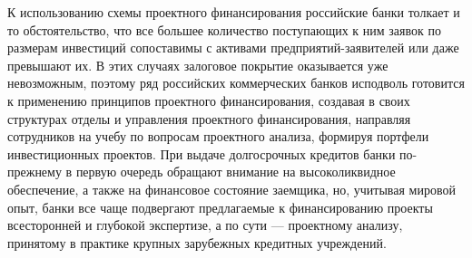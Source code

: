 К использованию схемы проектного финансирования российские банки толкает и то обстоятельство, что все большее количество поступающих к ним заявок по размерам инвестиций сопоставимы с активами предприятий-заявителей или даже превышают их.
В этих случаях залоговое покрытие оказывается уже невозможным, поэтому ряд российских коммерческих банков исподволь готовится к применению принципов проектного финансирования, создавая в своих структурах отделы и управления проектного финансирования, направляя сотрудников на учебу по вопросам проектного анализа, формируя портфели инвестиционных проектов.
При выдаче долгосрочных кредитов банки по-прежнему в первую очередь обращают внимание на высоколиквидное обеспечение, а также на финансовое состояние заемщика, но, учитывая мировой опыт, банки все чаще подвергают предлагаемые к финансированию проекты всесторонней и глубокой экспертизе, а по сути --- проектному анализу, принятому в практике крупных зарубежных кредитных учреждений.